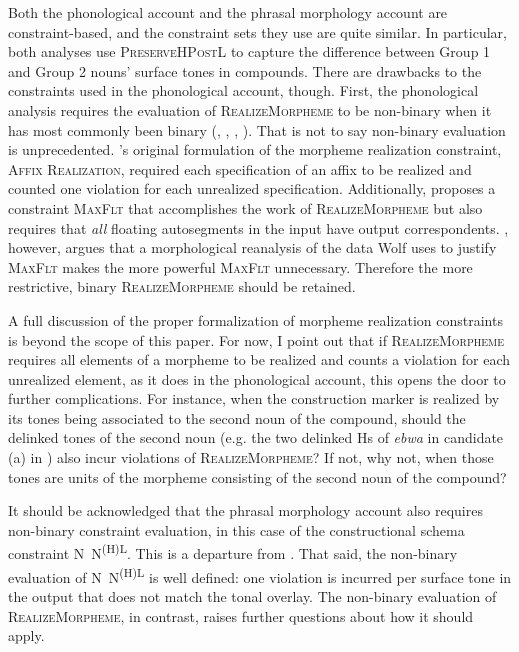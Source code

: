 \documentclass[output=paper]{langscibook}
\begin{document}
Both the phonological account and the phrasal morphology account are constraint-based, and the constraint sets they use are quite similar. In particular, both analyses use \textsc{PreserveHPostL} to capture the difference between Group 1 and Group 2 nouns’ surface tones in compounds. There are drawbacks to the constraints used in the phonological account, though. First, the phonological analysis requires the evaluation of \textsc{RealizeMorpheme} to be non-binary when it has most commonly been binary (\citealt{Gnanadesikan1997}, \citealt{Kurisu2001}, \citealt{Oostendorp2005}, \citealt{Wolf2007}). That is not to say non-binary evaluation is unprecedented. \citet{SamekLodovici1992}’s original formulation of the morpheme realization constraint, \textsc{Affix} \textsc{Realization}, required each specification of an affix to be realized and counted one violation for each unrealized specification. Additionally, \citet{Wolf2007} proposes a constraint \textsc{MaxFlt} that accomplishes the work of \textsc{RealizeMorpheme} but also requires that \textit{all} floating autosegments in the input have output correspondents. \citet{Trommer2012}, however, argues that a morphological reanalysis of the data Wolf uses to justify \textsc{MaxFlt} makes the more powerful \textsc{MaxFlt} unnecessary. Therefore the more restrictive, binary \textsc{RealizeMorpheme} should be retained. 

A full discussion of the proper formalization of morpheme realization constraints is beyond the scope of this paper. For now, I point out that if \textsc{RealizeMorpheme} requires all elements of a morpheme to be realized and counts a violation for each unrealized element, as it does in the phonological account, this opens the door to further complications. For instance, when the construction marker is realized by its tones being associated to the second noun of the compound, should the delinked tones of the second noun (e.g. the two delinked Hs of \textit{ebwa} in candidate (a) in ) also incur violations of \textsc{RealizeMorpheme}? If not, why not, when those tones are units of the morpheme consisting of the second noun of the compound? 

It should be acknowledged that the phrasal morphology account also requires non-binary constraint evaluation, in this case of the constructional schema constraint N~N\textsuperscript{(H)L}. This is a departure from \citet{McPherson2014}. That said, the non-binary evaluation of N~N\textsuperscript{(H)L} is well defined: one violation is incurred per surface tone in the output that does not match the tonal overlay. The non-binary evaluation of \textsc{RealizeMorpheme}, in contrast, raises further questions about how it should apply. 
\end{document}
